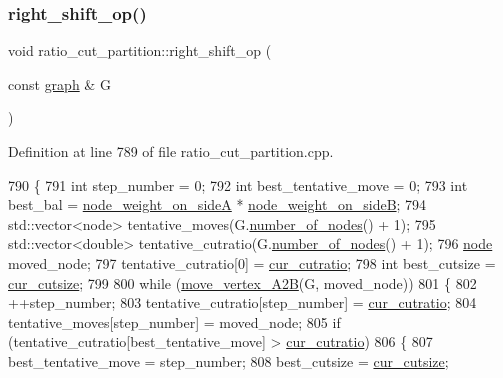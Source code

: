 \subsubsection{\texorpdfstring{right\+\_\+shift\+\_\+op()}{right\_shift\_op()}}
{\footnotesize\ttfamily void ratio\+\_\+cut\+\_\+partition\+::right\+\_\+shift\+\_\+op (\begin{DoxyParamCaption}\item[{const \mbox{\hyperlink{classgraph}{graph}} \&}]{G }\end{DoxyParamCaption})\hspace{0.3cm}{\ttfamily [protected]}}



Definition at line 789 of file ratio\+\_\+cut\+\_\+partition.\+cpp.


\begin{DoxyCode}
790 \{
791     \textcolor{keywordtype}{int} step\_number = 0;
792     \textcolor{keywordtype}{int} best\_tentative\_move = 0;
793     \textcolor{keywordtype}{int} best\_bal = \mbox{\hyperlink{classratio__cut__partition_af1b839e48e498cf8ca93c8ec5df8a686}{node\_weight\_on\_sideA}} * 
      \mbox{\hyperlink{classratio__cut__partition_aa16d1b508db86eb0ba4824642394999a}{node\_weight\_on\_sideB}};
794     std::vector<node> tentative\_moves(G.\mbox{\hyperlink{classgraph_a42c78e0a9f115655e3ff0efe35ebfc4e}{number\_of\_nodes}}() + 1);
795     std::vector<double> tentative\_cutratio(G.\mbox{\hyperlink{classgraph_a42c78e0a9f115655e3ff0efe35ebfc4e}{number\_of\_nodes}}() + 1);
796     \mbox{\hyperlink{classnode}{node}} moved\_node;
797     tentative\_cutratio[0] = \mbox{\hyperlink{classratio__cut__partition_a9dad324884cef5bcdd50122fc98e0860}{cur\_cutratio}};
798     \textcolor{keywordtype}{int} best\_cutsize = \mbox{\hyperlink{classratio__cut__partition_aa01f2d6257fff28739e2431fe826ef71}{cur\_cutsize}};
799 
800     \textcolor{keywordflow}{while} (\mbox{\hyperlink{classratio__cut__partition_a8988d72cd456e79243f0e1c1b03ed501}{move\_vertex\_A2B}}(G, moved\_node))
801     \{
802     ++step\_number;
803     tentative\_cutratio[step\_number] = \mbox{\hyperlink{classratio__cut__partition_a9dad324884cef5bcdd50122fc98e0860}{cur\_cutratio}};
804     tentative\_moves[step\_number] = moved\_node;
805     \textcolor{keywordflow}{if} (tentative\_cutratio[best\_tentative\_move] > \mbox{\hyperlink{classratio__cut__partition_a9dad324884cef5bcdd50122fc98e0860}{cur\_cutratio}})
806     \{
807         best\_tentative\_move = step\_number;
808         best\_cutsize = \mbox{\hyperlink{classratio__cut__partition_aa01f2d6257fff28739e2431fe826ef71}{cur\_cutsize}};

\end{DoxyCode}
